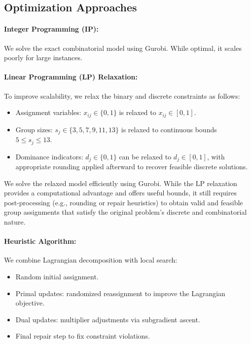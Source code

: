 \subsection*{Optimization Approaches}

\paragraph{Integer Programming (IP):}
We solve the exact combinatorial model using Gurobi. While optimal, it scales poorly for large instances.

\paragraph{Linear Programming (LP) Relaxation:}
To improve scalability, we relax the binary and discrete constraints as follows:  
\begin{itemize}  
    \item Assignment variables: \( x_{ij} \in \{0, 1\} \) is relaxed to \( x_{ij} \in [0, 1] \).  
    \item Group sizes: \( s_j \in \{3, 5, 7, 9, 11, 13\} \) is relaxed to continuous bounds \( 5 \leq s_j \leq 13 \).  
    \item Dominance indicators: \( d_j \in \{0, 1\} \) can be relaxed to \( d_j \in [0, 1] \), with appropriate rounding applied afterward to recover feasible discrete solutions.  
\end{itemize}  
We solve the relaxed model efficiently using Gurobi. While the LP relaxation provides a computational advantage and offers useful bounds, it still requires post-processing (e.g., rounding or repair heuristics) to obtain valid and feasible group assignments that satisfy the original problem’s discrete and combinatorial nature.

\paragraph{Heuristic Algorithm:}
We combine Lagrangian decomposition with local search:
\begin{itemize}
    \item Random initial assignment.
    \item Primal updates: randomized reassignment to improve the Lagrangian objective.
    \item Dual updates: multiplier adjustments via subgradient ascent.
    \item Final repair step to fix constraint violations.
\end{itemize}

